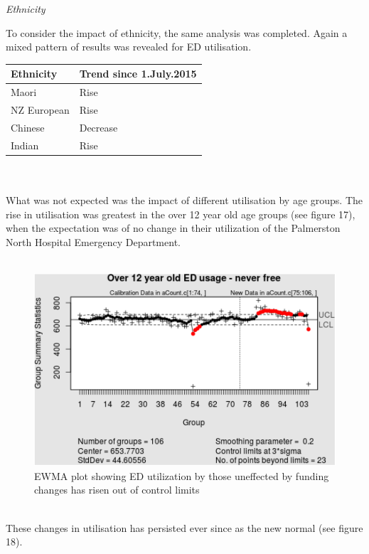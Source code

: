 \documentclass[11pt,a4paper]{article}
\begin{document}
\emph{Ethnicity}

To consider the impact of ethnicity, the same analysis was completed. Again a mixed pattern of results was revealed for ED utilisation.\\

\begin{tabular}{|l|l|}
\hline
	Ethnicity & Trend since 1.July.2015\\
\hline
	Maori & Rise\\
\hline
	NZ European & Rise\\
\hline
	Chinese & Decrease\\
\hline
	Indian & Rise\\
\hline
\end{tabular}
\\
\\
What was not expected was the impact of different utilisation by age groups. The rise in utilisation was greatest in the over 12 year old age groups (see figure 17), when the expectation was of no change in their utilization of the Palmerston North Hospital Emergency Department.\\
\\
\begin{figure}[htp]
\centering
\includegraphics[scale=0.50]{Over12.png}
\caption{EWMA plot showing ED utilization by those uneffected by funding changes has risen out of control limits}
\label{Rise in ED utilisation by over 12 year olds}
\end{figure}
\\

These changes in utilisation has persisted ever since as the new normal (see figure 18).\\
\\
\end{document}
